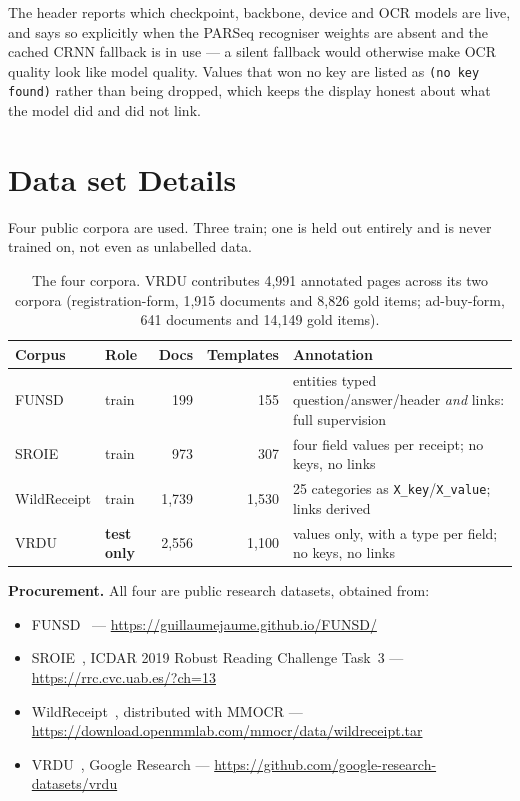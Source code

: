 \documentclass[11pt,a4paper]{article}
\newcommand{\code}[1]{\texttt{\small #1}}
\begin{document}
The header reports which checkpoint, backbone, device and OCR models are live, and says so
explicitly when the PARSeq recogniser weights are absent and the cached CRNN fallback is in use ---
a silent fallback would otherwise make OCR quality look like model quality. Values that won no key
are listed as \code{(no key found)} rather than being dropped, which keeps the display honest
about what the model did and did not link.

\section{Data set Details}
\label{sec:data}

Four public corpora are used. Three train; one is held out entirely and is never trained on,
not even as unlabelled data.

\begin{table}[htbp]
\centering\small
\begin{tabular}{@{}llrrp{4.9cm}@{}}
\toprule
\textbf{Corpus} & \textbf{Role} & \textbf{Docs} & \textbf{Templates} & \textbf{Annotation} \\
\midrule
FUNSD        & train & 199   & 155   & entities typed question/answer/header \emph{and} links: full supervision \\
SROIE        & train & 973   & 307   & four field values per receipt; no keys, no links \\
WildReceipt  & train & 1{,}739 & 1{,}530 & 25 categories as \code{X\_key}/\code{X\_value}; links derived \\
VRDU         & \textbf{test only} & 2{,}556 & 1{,}100 & values only, with a type per field; no keys, no links \\
\bottomrule
\end{tabular}
\caption{The four corpora. VRDU contributes 4{,}991 annotated pages across its two corpora
(registration-form, 1{,}915 documents and 8{,}826 gold items; ad-buy-form, 641 documents and
14{,}149 gold items).}
\label{tab:data}
\end{table}

\textbf{Procurement.} All four are public research datasets, obtained from:

\begin{itemize}[leftmargin=1.4em,itemsep=0pt]
  \item FUNSD~\cite{funsd} --- \url{https://guillaumejaume.github.io/FUNSD/}
  \item SROIE~\cite{sroie}, ICDAR 2019 Robust Reading Challenge Task~3 ---
        \url{https://rrc.cvc.uab.es/?ch=13}
  \item WildReceipt~\cite{sdmgr}, distributed with MMOCR ---
        \url{https://download.openmmlab.com/mmocr/data/wildreceipt.tar}
  \item VRDU~\cite{vrdu}, Google Research ---
        \url{https://github.com/google-research-datasets/vrdu}
\end{itemize}
\end{document}
